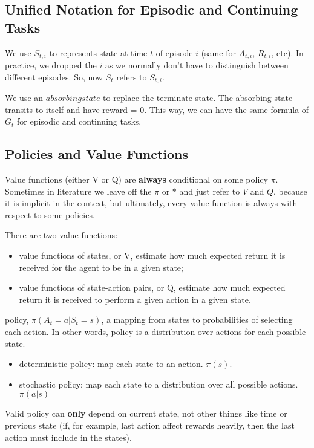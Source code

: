 \documentclass[sutton_barto_notes.tex]{subfiles}
\begin{document}
\subsection{Unified Notation for Episodic and Continuing Tasks}

We use $S_{t,i}$ to represents state at time $t$ of episode $i$ (same for $A_{t,i}$, $R_{t,i}$, etc).
In practice, we dropped the $i$ as we normally don't have to distinguish between different episodes.
So, now $S_t$ refers to $S_{t,i}$.

We use an $absorbing state$ to replace the terminate state. The absorbing state transits to itself and have reward = 0.
This way, we can have the same formula of $G_t$ for episodic and continuing tasks.

\subsection{Policies and Value Functions}

Value functions (either V or Q) are \textbf{always} conditional on some policy $\pi$. Sometimes in literature we leave off the $\pi$ or $*$ and just refer to $V$ and $Q$, because it is implicit in the context, but ultimately, every value function is always with respect to some policies.

\begin{definition}
There are two value functions:
\begin{itemize}
\item value functions of states, or V, estimate how much expected return it is received for the agent to be in a given state;
\item value functions of state-action pairs, or Q, estimate how much expected return it is received to perform a given action in a given state.
\end{itemize}
\end{definition}

\begin{definition}
policy, $\pi(A_t=a|S_t=s)$, a mapping from states to probabilities of selecting each action. In other words, policy is a distribution over actions for each possible state.
\end{definition}
\begin{itemize}
\item deterministic policy: map each state to an action. $\pi(s)$. 
\item stochastic policy: map each state to a distribution over all possible actions. $\pi(a|s)$
\end{itemize}
Valid policy can \textbf{only} depend on current state, not other things like time or previous state (if, for example, last action affect rewards heavily, then the last action must include in the states). 
\newline
\end{document}

